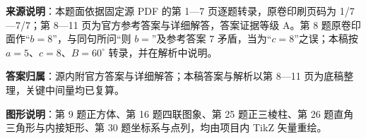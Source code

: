 

\begin{gktip}
\textbf{来源说明}：本题面依据固定源 PDF 的第 1—7 页逐题转录，原卷印刷页码为 1/7—7/7；第 8—11 页为官方参考答案与详细解答，答案证据等级 A。第 8 题原卷印面作“$b=8$”，与同句所问“则 $b=$”及参考答案 $7$ 矛盾，当为“$c=8$”之误；本稿按 $a=5$、$c=8$、$B=60^\circ$ 转录，并在解析中说明。

\textbf{答案归属}：源内附官方答案与详细解答；本稿答案与解析以第 8—11 页为底稿整理，关键中间量均已复算。

\textbf{图形说明}：第 9 题正方体、第 16 题四联图象、第 25 题正三棱柱、第 26 题直角三角形与内接矩形、第 30 题坐标系与点列，均由项目内 TikZ 矢量重绘。
\end{gktip}


